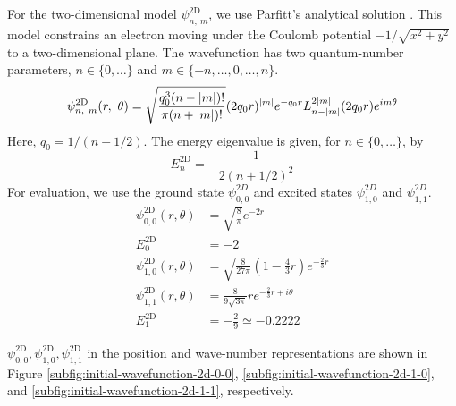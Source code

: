 \documentclass[a4paper,11pt]{article}
\begin{document}
For the two-dimensional model $\psi_{n,\ m}^{\mathrm{2D}}$, we use Parfitt’s
analytical solution \cite{Parfitt2002.10.1063/1.1503868}. This model constrains
an electron moving under the Coulomb potential $-1/\sqrt{x^2+y^2}$ to a
two-dimensional plane. The wavefunction has two quantum-number parameters,
$n\in\{0,\ldots\}$ and $m\in\{-n,\ldots,0,\ldots,n\}$.
\begin{equation}
\psi_{n,\ m}^{\mathrm{2D}}(r,\ \theta)=
\sqrt{\frac{q_0^3(n-{\left| m \right|})!}{\pi(n+{\left| m \right|})!}}(2q_0r)^{{\left| m \right|}}
e^{-q_0r}L_{n-{\left| m \right|}}^{2{\left| m \right|}}(2q_0r)e^{im\theta}
\end{equation}
Here, $q_0=1/(n+1/2)$. The energy eigenvalue is given, for
$n\in\{0,\ldots\}$, by
\begin{equation}
E_n^{\mathrm{2D}}=-\frac{1}{2(n+1/2)^2}
\end{equation}
For evaluation, we use the ground state $\psi_{0,0}^{2D}$ and excited states
$\psi_{1,0}^{2D}$ and $\psi_{1,1}^{2D}$.
\begin{align}
\psi_{0,0}^{\mathrm{2D}}(r,\theta)&=\sqrt{\frac{8}{\pi}}e^{-2r}
\label{eq:psi2D00-wave-function}\\
E_0^{\mathrm{2D}}&=-2
\label{eq:psi2D00-energy}\\
\psi_{1,0}^{\mathrm{2D}}(r,\theta)&=\sqrt{\frac{8}{27\pi}}(1-\frac{4}{3}r)e^{-\frac{2}{3}r} 
\label{eq:psi2D10-wave-function}\\
\psi_{1,1}^{\mathrm{2D}}(r,\theta)&=\frac{8}{9\sqrt{3\pi}}re^{-\frac{2}{3}r+i\theta}
\label{eq:psi2D11-wave-function}\\
E_1^{\mathrm{2D}}&=-\frac{2}{9}\simeq -0.2222
\label{eq:psi2D10-energy}
\end{align}

$\psi_{0,0}^{\mathrm{2D}}, \psi_{1,0}^{\mathrm{2D}}, \psi_{1,1}^{\mathrm{2D}}$
in the position and wave-number representations are shown in Figure
\ref{subfig:initial-wavefunction-2d-0-0},
\ref{subfig:initial-wavefunction-2d-1-0}, and
\ref{subfig:initial-wavefunction-2d-1-1}, respectively.
\end{document}
